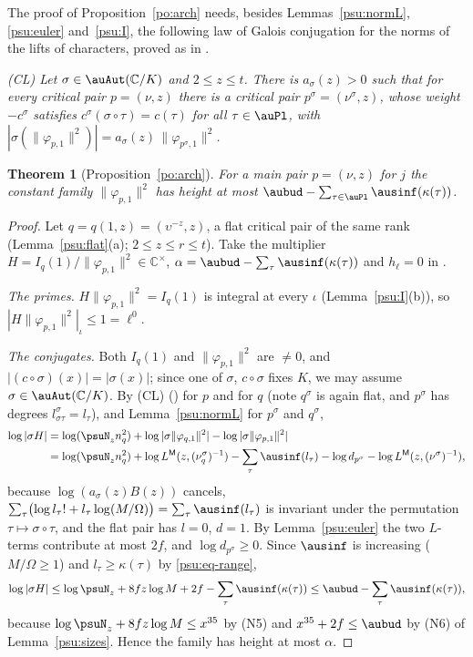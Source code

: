 \documentclass[10pt]{amsart}
\newtheorem{theorem}{Theorem}[section]
\theoremstyle{definition}
\theoremstyle{remark}
\newcommand{\C}{\mathbb C}
\begin{document}
The proof of Proposition~\ref{po:arch} needs, besides Lemmas~\ref{psu:normL}, \ref{psu:euler}
and~\ref{psu:I}, the following law of Galois conjugation for the norms of the lifts of characters,
proved as {\cite[Theorem~9.1]{P53}} in {\cite[\S9]{P53}}.

\emph{(CL) Let $\sigma\in\auAut(\C/K)$ and $2\le z\le t$. There is $a_\sigma(z)>0$ such that for every
critical pair $p=(\nu,z)$ there is a critical pair $p^\sigma=(\nu^\sigma,z)$, whose weight $-c^\sigma$
satisfies $c^\sigma(\sigma\circ\tau)=c(\tau)$ for all $\tau\in\auPl$, with
$|\sigma(\|\varphi_{p,1}\|^2)|=a_\sigma(z)\,\|\varphi_{p^\sigma,1}\|^2$.}

\begin{theorem}[Proposition~\ref{po:arch}]\label{psu:arch}
For a main pair $p=(\nu,z)$ for $j$ the constant family $\|\varphi_{p,1}\|^2$ has height
at most $\aubud-\sum_{\tau\in\auPl}\ausinf(\kappa(\tau))$.
\end{theorem}
\begin{proof}
Let $q=q(1,z)=(\upsilon^{-z},z)$, a flat critical pair of the same rank (Lemma~\ref{psu:flat}(a);
$2\le z\le r\le t$). Take the multiplier $H=I_q(1)/\|\varphi_{p,1}\|^2\in\C^\times$, $\alpha=\aubud-
\sum_\tau\ausinf(\kappa(\tau))$ and $h_\ell=0$ in {\cite[Definition~14.1]{P46}}.

\emph{The primes.} $H\|\varphi_{p,1}\|^2=I_q(1)$ is integral at every $\iota$ (Lemma~\ref{psu:I}(b)), so
$|H\|\varphi_{p,1}\|^2|_\iota\le1=\ell^{0}$.

\emph{The conjugates.} Both $I_q(1)$ and $\|\varphi_{p,1}\|^2$ are $\ne0$, and $|(c\circ\sigma)(x)|=|\sigma(x)|$;
since one of $\sigma$, $c\circ\sigma$ fixes $K$, we may assume $\sigma\in\auAut(\C/K)$. By (CL) ({\cite[Theorem~9.1]{P53}}) for $p$ and
for $q$ (note $q^\sigma$ is again flat, and $p^\sigma$ has degrees $l^\sigma_{\sigma\tau}=l_\tau$), and
Lemma~\ref{psu:normL} for $p^\sigma$ and $q^\sigma$,
\begin{align*}
\log|\sigma H|&=\log(\psuN_zn_q^2)+\log|\sigma\|\varphi_{q,1}\|^2|-\log|\sigma\|\varphi_{p,1}\|^2|\\
&=\log(\psuN_zn_q^2)+\log L^{\mathsf M}(z,(\nu_q^\sigma)^{-1})-\sum_\tau\ausinf(l_\tau)-\log d_{p^\sigma}-\log
L^{\mathsf M}(z,(\nu^\sigma)^{-1}),
\end{align*}
because $\log(a_\sigma(z)B(z))$ cancels, $\sum_\tau\bigl(\log l_\tau!+l_\tau\log(M/\Omega)\bigr)=\sum_\tau
\ausinf(l_\tau)$ is invariant under the permutation $\tau\mapsto\sigma\circ\tau$, and the flat pair has
$l=0$, $d=1$. By Lemma~\ref{psu:euler} the two $L$-terms contribute at most $2f$, and $\log d_{p^\sigma}
\ge0$. Since $\ausinf$ is increasing ($M/\Omega\ge1$) and $l_\tau\ge\kappa(\tau)$ by \eqref{psu:eq-range},
\[
\log|\sigma H|\le\log\psuN_z+8fz\log M+2f-\sum_\tau\ausinf(\kappa(\tau))\le\aubud-\sum_\tau\ausinf(\kappa
(\tau)),
\]
because $\log\psuN_z+8fz\log M\le x^{35}$ by (N5) and $x^{35}+2f\le\aubud$ by (N6) of
Lemma~\ref{psu:sizes}. Hence the family has height at most $\alpha$.
\end{proof}
\end{document}

